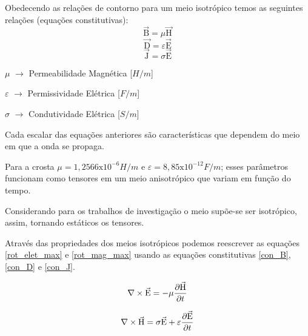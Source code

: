            Obedecendo as relações de contorno para um meio isotrópico temos as seguintes
            relações (equações constitutivas):
            \begin{equation}
                \label{con_B}
                \vec{\textrm{B}} = \mu \vec{\textrm{H}}
            \end{equation}
            \begin{equation}
                \label{con_D}
                \vec{\textrm{D}} = \varepsilon  \vec{\textrm{E}}
            \end{equation}
            \begin{equation}
                \label{con_J}
                \vec{\textrm{J}} = \sigma \vec{\textrm{E}}
            \end{equation}
	    
            {\footnotesize \noindent $\mu$ $\rightarrow$ Permeabilidade Magnética [$H/m$]
	    
            \noindent $\varepsilon$ $\rightarrow$ Permissividade Elétrica [$F/m$]
	    
            \noindent $\sigma$ $\rightarrow$ Condutividade Elétrica [$S/m$]}
	    
            Cada escalar das equações anteriores são características que dependem do meio em que a onda se propaga.
	    
            Para a crosta $\mu = 1,2566\textrm{x}10^{-6} H/m$ e $\varepsilon = 8,85
            \textrm{x}10^{-12} F/m$; esses parâmetros funcionam como tensores em um meio
            anisotrópico que variam em função do tempo.
            
            Considerando para os 
            trabalhos de investigação o meio supõe-se ser isotrópico, assim, 
            tornando estáticos os tensores.
	
            Através das propriedades dos meios isotrópicos podemos reescrever as equações \ref{rot_elet_max} e \ref{rot_mag_max} usando as equações constitutivas \ref{con_B}, \ref{con_D} e \ref{con_J}.
            
            \begin{equation}
                \label{rot_elet_con}
                \nabla \times \vec{\textrm{E}} = - \mu \dfrac{\partial \vec{\textrm{H}}}{\partial t}
            \end{equation}
            
            \begin{equation}
                \label{rot_mag_con}
                \nabla \times \vec{\textrm{H}} = \sigma \vec{\textrm{E}} + \varepsilon \dfrac{\partial \vec{\textrm{E}}}{\partial t}
            \end{equation}
            

